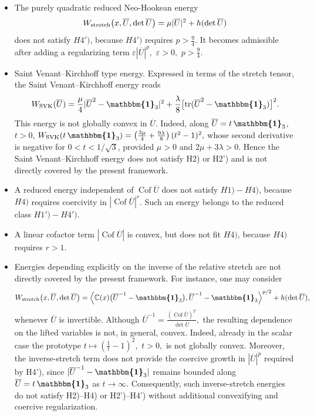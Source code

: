 \documentclass[11pt]{article}
\newcommand{\id}{{\boldsymbol{\mathbbm{1}}}}
\newcommand{\tr}{{\rm tr}}
\DeclareMathOperator{\Cof}{Cof}
\begin{document}
\begin{itemize}

\item The purely quadratic reduced Neo-Hookean energy
\begin{align}
        W_{\rm stretch}\bigl(x,\overline U,\det \overline U\bigr)
        =
        \mu  | \overline U | ^2+h(\det \overline U)
\end{align}
does not satisfy $H4')$, because $H4')$ requires $p>\frac{9}{4}$. It becomes
admissible after adding a regularizing term
$
        \varepsilon | \overline U | ^p,
      $ $
        \varepsilon>0,
       $ $
        p>\frac{9}{4}.
$

\item {Saint Venant--Kirchhoff type energy.}
Expressed in terms of the stretch tensor, the Saint Venant--Kirchhoff energy reads
\begin{align}
W_{\rm SVK}(\overline U)
=
\frac{\mu}{4}|\overline U^2-\id_3|^2
+
\frac{\lambda}{8}
\bigl[\tr(\overline U^2-\id_3)\bigr]^2 .
\end{align}
This energy is not globally convex in $\overline U$. Indeed, along
$\overline U=t\,\id_3$, $t>0$,
$
W_{\rm SVK}(t\,\id_3)
=
\left(
\frac{3\mu}{4}
+
\frac{9\lambda}{8}
\right)(t^2-1)^2,
$
whose second derivative is negative for $0<t<1/\sqrt{3}$, provided
$\mu>0$ and $2\mu+3\lambda>0$. Hence the Saint Venant--Kirchhoff energy
does not satisfy H2) or H2') and is not directly covered by the present
framework.

\item A reduced energy independent of $\Cof \overline U$ does not satisfy $H1)-H4)$,
because $H4)$ requires coercivity in $|\Cof \overline U|^r$. Such an energy belongs to
the reduced class $H1')-H4')$.

\item A linear cofactor term
$
         | \Cof \overline U | 
$
is convex, but does not fit $H4)$, because $H4)$ requires
$
        r>1.
$
\item  {
Energies depending explicitly on the inverse of the relative stretch are not
directly covered by the present framework. For instance, one may consider
\begin{align}
W_{\rm stretch}\bigl(x,\overline U,\det\overline U\bigr)
=
\left\langle
\mathbb C(x)
\bigl(\overline U^{-1}-\id_3\bigr),
\overline U^{-1}-\id_3
\right\rangle^{p/2}
+
h(\det\overline U),
\end{align}
whenever $\overline U$ is invertible. Although
$
\overline U^{-1}
=
\frac{(\Cof\overline U)^T}{\det\overline U},
$
the resulting dependence on the lifted variables is not, in general, convex.
Indeed, already in the scalar case the prototype
$
t\mapsto \left(\frac1t-1\right)^2,$ $
 t>0,
$
is not globally convex. Moreover, the inverse-stretch term does not provide
the coercive growth in $|\overline U|^p$ required by H4'), since
$|\overline U^{-1}-\id_3|$ remains bounded along
$\overline U=t\,\id_3$ as $t\to\infty$.
Consequently, such inverse-stretch energies do not satisfy H2)--H4) or
H2')--H4') without additional convexifying and coercive regularization.}


\end{itemize}
\end{document}
